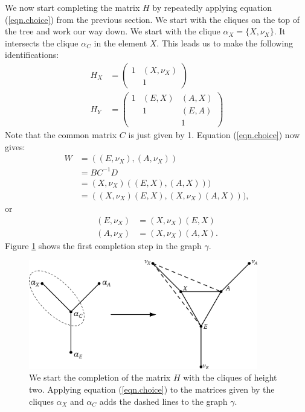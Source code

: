 \documentclass[11pt, a4paper]{article}
\begin{document}
We now start completing the matrix $H$ by repeatedly applying equation (\ref{eqn.choice}) from the previous section. We start with the cliques on the top of the tree and work our way down. We start with the clique $\alpha_X=\{X, \nu_X\}$. It intersects the clique $\alpha_C$ in the element $X$. This leads us to make the following identifications:
\begin{align}
	H_X & = \begin{pmatrix}
		1 & (X, \nu_X) \\
		& 1
	\end{pmatrix} \\
	H_Y & = \begin{pmatrix}
		1 & (E,X) & (A,X) \\
		& 1 & (E,A) \\
		& & 1 
	\end{pmatrix}
\end{align}
Note that the common matrix $C$ is just given by 1. Equation (\ref{eqn.choice}) now gives:
\begin{align}
	W & = ( (E,\nu_X), (A,\nu_X) ) \\
	& = BC^{-1}D \\
	& = (X, \nu_X) ( (E,X), (A,X) ) ) \\
	& =  ( (X, \nu_X)(E,X), (X, \nu_X)(A,X) ) ), 
\end{align}
or 
\begin{align}
	(E,\nu_X) & = (X, \nu_X)(E,X) \\
	(A,\nu_X) & = (X, \nu_X)(A,X).
\end{align}
Figure \ref{fig.firstStep} shows the first completion step in the graph $\gamma$. 

\begin{figure}[hbt]
  \begin{center}
  	\includegraphics[width=10cm]{img/firstStep.png}
  \end{center}
  \caption{We start the completion of the matrix $H$ with the cliques of height two. Applying equation (\ref{eqn.choice}) to the matrices given by the cliques $\alpha_X$ and $\alpha_C$ adds the dashed lines to the graph $\gamma$.}\label{fig.firstStep}
\end{figure}
\end{document}
